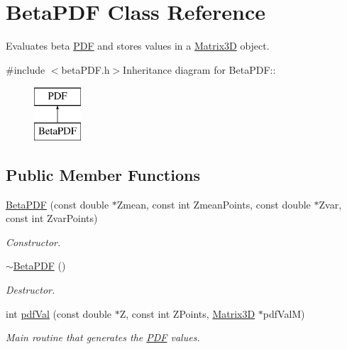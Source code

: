 \hypertarget{classBetaPDF}{
\section{BetaPDF Class Reference}
\label{de/d4f/classBetaPDF}
}


Evaluates beta \hyperlink{classPDF}{PDF} and stores values in a \hyperlink{classMatrix3D}{Matrix3D} object.  


{\ttfamily \#include $<$betaPDF.h$>$}Inheritance diagram for BetaPDF::\begin{figure}[H]
\begin{center}
\leavevmode
\includegraphics[height=2cm]{de/d4f/classBetaPDF}
\end{center}
\end{figure}
\subsection*{Public Member Functions}
\begin{DoxyCompactItemize}
\item 
\hypertarget{classBetaPDF_a0b5160ebefdcd8b696a45a131bab3261}{
\hyperlink{classBetaPDF_a0b5160ebefdcd8b696a45a131bab3261}{BetaPDF} (const double $\ast$Zmean, const int ZmeanPoints, const double $\ast$Zvar, const int ZvarPoints)}
\label{de/d4f/classBetaPDF_a0b5160ebefdcd8b696a45a131bab3261}

\begin{DoxyCompactList}\small\item\em Constructor. \item\end{DoxyCompactList}\item 
\hypertarget{classBetaPDF_a3394efd2861f7a2d5944365ea0edbe50}{
\hyperlink{classBetaPDF_a3394efd2861f7a2d5944365ea0edbe50}{$\sim$BetaPDF} ()}
\label{de/d4f/classBetaPDF_a3394efd2861f7a2d5944365ea0edbe50}

\begin{DoxyCompactList}\small\item\em Destructor. \item\end{DoxyCompactList}\item 
int \hyperlink{classBetaPDF_a5c27da056f9c9b17af0888fac7df2c9f}{pdfVal} (const double $\ast$Z, const int ZPoints, \hyperlink{classMatrix3D}{Matrix3D} $\ast$pdfValM)
\begin{DoxyCompactList}\small\item\em Main routine that generates the \hyperlink{classPDF}{PDF} values. \item\end{DoxyCompactList}\end{DoxyCompactItemize}


